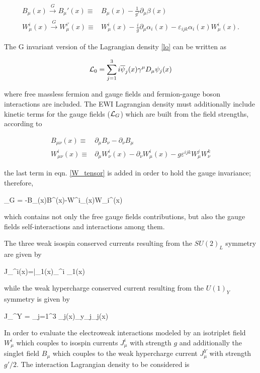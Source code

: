 \begin{align}\label{f_transf}
B_\mu(x) \xrightarrow[]{G} B_\mu'(x)\equiv & B_\mu(x)
- \frac{1}{g'}\partial_\mu\beta(x) \nonumber\\
W^i_\mu(x) \xrightarrow[]{G} W_\mu^{i\prime}(x)\equiv & W^i_\mu(x) - \frac{i}{g}\partial_\mu \alpha_i(x) - \varepsilon_{ijk}\alpha_i(x)W^i_\mu(x).
\end{align}

\noindent The G invariant version of the Lagrangian density \ref{lo} can be written as

\begin{equation}\label{linv}
\mathcal{L}_0 = \sum_{j=1}^3 i\overline{\psi}_j(x)\gamma^\mu D_\mu \psi_j(x)
\end{equation}

\noindent where free massless fermion and gauge fields and fermion-gauge boson interactions are included. The EWI Lagrangian density must additionally include kinetic terms for the gauge fields ($\mathcal{L}_G$) which are built from the field strengths, according to

\begin{align}
B_{\mu\nu}(x)   \equiv & \partial_\mu B_\nu -  \partial_\nu B_\mu \label{B_tensor} \\ 
W^i_{\mu\nu}(x) \equiv & \partial_\mu W^i_\nu(x) - \partial_\nu W^i_\mu(x) - g\varepsilon^{ijk}W^j_\mu W^k_\nu \label{W_tensor}
\end{align}

\noindent the last term in eqn. \ref{W_tensor} is added in order to hold the gauge invariance; therefore,

\beqn\label{lg}
\Lagr_G = -B_{\mu\nu}(x)B^{\mu\nu}(x)-W^i_{\mu\nu}(x)W_i^{\mu\nu}(x)
\eeqn

\noindent which contains not only the free gauge fields contributions, but also the gauge fields self-interactions and interactions among them.  

\noindent The three weak isospin conserved currents resulting from the $SU(2)_L$ symmetry are given by

\beqn
J_\mu^i(x)=\bar{\psi_1}(x)\gamma_\mu \sigma^i \psi_1(x) 
\eeqn

\noindent while the weak hypercharge conserved current resulting from the $U(1)_Y$ symmetry is given by 

\beqn
J_\mu^Y = \sum_{j=1}^3 \overline{\psi}_j(x)\gamma_\mu y_j\psi_j(x)
\eeqn

\noindent In order to evaluate the electroweak interactions modeled by an isotriplet field $W^i_\mu$ which couples to isospin currents $J^i_\mu$ with strength $g$ and additionally the singlet field $B_\mu$ which couples to the weak hypercharge current $J_\mu^Y$ with strength $g'/2$. The interaction Lagrangian density to be considered is

